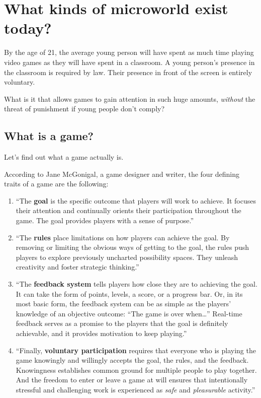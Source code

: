 \section{What kinds of microworld exist today?}

By the age of 21, the average young person will have spent as much time
playing video games as they will have spent in a classroom\cite{ted:mcgonigal}.
A young person's presence in the classroom is required by law. Their presence in
front of the screen is entirely voluntary.

What is it that allows games to gain attention in such huge amounts, \emph{without} the threat of punishment if young people don't comply?

\subsection{What is a game?}

Let's find out what a game actually is. 

According to Jane McGonigal, a game designer and writer, the four
defining traits of a game are the following:

\begin{enumerate}

\item
  ``The \textbf{goal} is the specific outcome that players will work to
  achieve. It focuses their attention and continually orients their
  participation throughout the game. The goal provides players with a
  sense of purpose.''\cite{rebroken}

\item
  ``The \textbf{rules} place limitations on how players can achieve the
  goal. By removing or limiting the obvious ways of getting to the goal,
  the rules push players to explore previously uncharted possibility
  spaces. They unleash creativity and foster strategic thinking.''\cite{rebroken}

\item
  ``The \textbf{feedback system} tells players how close they are to
  achieving the goal. It can take the form of points, levels, a score,
  or a progress bar. Or, in its most basic form, the feedback system can
  be as simple as the players' knowledge of an objective outcome: ``The
  game is over when\ldots'' Real-time feedback serves as a promise to
  the players that the goal is definitely achievable, and it provides
  motivation to keep playing.''\cite{rebroken}

\item
  ``Finally, \textbf{voluntary participation} requires that everyone who
  is playing the game knowingly and willingly accepts the goal, the
  rules, and the feedback. Knowingness establishes common ground for
  multiple people to play together. And the freedom to enter or leave a
  game at will ensures that intentionally stressful and challenging work
  is experienced as \emph{safe} and \emph{pleasurable} activity.''\cite{rebroken}
  
\end{enumerate}


